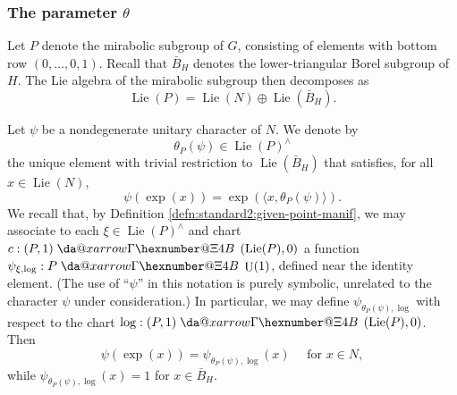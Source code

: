 \documentclass[reqno]{amsart}
\makeatletter
\newcommand*{\da@rightarrow}{\mathchar"0\hexnumber@\symAMSa 4B }
\newcommand*{\xdashrightarrow}[2][]{%
  \mathrel{%
    \mathpalette{\da@xarrow{#1}{#2}{}\da@rightarrow{\,}{}}{}%
  }%
}
\newcommand*{\da@xarrow}[7]{%
  \sbox0{$\ifx#7\scriptstyle\scriptscriptstyle\else\scriptstyle\fi#5#1#6\m@th$}%
  \sbox2{$\ifx#7\scriptstyle\scriptscriptstyle\else\scriptstyle\fi#5#2#6\m@th$}%
  \sbox4{$#7\dabar@\m@th$}%
  \dimen@=\wd0 %
  \ifdim\wd2 >\dimen@
    \dimen@=\wd2 %
  \fi
  \count@=2 %
  \def\da@bars{\dabar@\dabar@}%
  \@whiledim\count@\wd4<\dimen@\do{%
    \advance\count@\@ne
    \expandafter\def\expandafter\da@bars\expandafter{%
      \da@bars
      \dabar@ 
    }%
  }%
  \mathrel{#3}%
  \mathrel{%
    \mathop{\da@bars}\limits
    \ifx\\#1\\%
    \else
      _{\copy0}%
    \fi
    \ifx\\#2\\%
    \else
      ^{\copy2}%
    \fi
  }%
  \mathrel{#4}%
}
\DeclareMathOperator{\U}{U}
\DeclareMathOperator{\Lie}{Lie}
\theoremstyle{plain} \newtheorem{theorem} {Theorem}
\theoremstyle{definition} \newtheorem{definition} [theorem] {Definition}
\theoremstyle{itplain} %
\numberwithin{equation}{section}
\numberwithin{theorem}{section}
\makeatother
\begin{document}
\subsubsection{The parameter $\theta$}\label{sec:parameter-theta}
Let $P$ denote the mirabolic subgroup of $G$, consisting of elements with bottom row $(0,\dotsc,0,1)$.  Recall that $\bar{B}_H$ denotes the lower-triangular Borel subgroup of $H$.  The Lie algebra of the mirabolic subgroup then decomposes as
\begin{equation*}
\Lie(P) = \Lie(N) \oplus \Lie(\bar{B}_H).
\end{equation*}

Let $\psi$ be a nondegenerate unitary character of $N$.  We denote by 
\begin{equation*}
\theta_P(\psi)  \in \Lie(P)^\wedge
\end{equation*}
the unique element with trivial restriction to $\Lie(\bar{B}_H)$ that satisfies, for all $x \in \Lie(N)$,
\begin{equation*}
  \psi(\exp(x)) = \exp (\langle x, \theta_P(\psi)  \rangle).
\end{equation*}
We recall that, by Definition \ref{defn:standard2:given-point-manif}, we may associate to each $\xi \in \Lie(P)^\wedge$ and chart $c : (P,1) \xdashrightarrow{} (\Lie(P),0)$ a function $\psi_{\xi, \log} : P \xdashrightarrow{} \U(1)$, defined near the identity element.  (The use of ``$\psi$'' in this notation is purely symbolic, unrelated to the character $\psi$ under consideration.)  In particular, we may define $\psi_{\theta_P(\psi),\log}$  with respect to the chart $\log :  (P, 1) \xdashrightarrow{} (\Lie(P), 0)$.  Then
\begin{equation*}
  \psi(\exp(x)) = \psi_{\theta_P(\psi), \log}(x) \quad \text{ for } x \in N,
\end{equation*}
while $\psi_{\theta_P(\psi), \log}(x) = 1$ for $x \in \bar{B}_H$.
\end{document}
